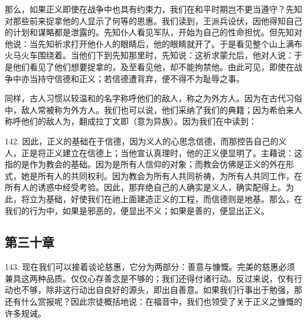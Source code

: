 那么，如果正义即使在战争中也具有约束力，我们在和平时期岂不更当遵守？先知对那些前来捉拿他的人显示了何等的恩惠。我们读到，王派兵设伏，因他得知自己的计划和谋略都是泄露的。先知仆人看见军队，开始为自己的性命担忧。但先知对他说：当先知祈求打开他仆人的眼睛后，他的眼睛就开了。于是看见整个山上满布火马火车围绕着。当他们下到先知那里时，先知说：这祈求蒙允后，他对人说：于是他们看见了他们想要捉拿的，及至看见他，却不能拘禁他。由此可见，即使在战争中亦当持守信德和正义；若信德遭背弃，便不得不为耻辱之事。\par

同样，古人习惯以较温和的名字称呼他们的敌人，称之为外方人。因为在古代习俗中，敌人常被称为外方人。我们也可以说，他们采纳了我们的典籍；因为希伯来人称呼他们的敌人为，翻成拉丁文即（意为异族）。因为我们在中读到：\par

142. 因此，正义的基础在于信德，因为义人的心思念信德，而那控告自己的义人，正是将正义建立在信德上；当他宣认真理时，他的正义便显明了。主藉说：这指的是作为教会的基础。因为是所有人信仰的对象；而教会仿佛是正义的外在形式，她是所有人的共同权利。因为教会为所有人共同祈祷，为所有人共同工作，在所有人的诱惑中经受考验。因此，那弃绝自己的人确实是义人，确实配得上。为此，将立为基础，好使我们在祂上面建造正义的工程，而信德则是地基。那么，在我们的行为中，如果是邪恶的，便显出不义；如果是善的，便显出正义。\par


\subsection{第三十章}

\par

143. 现在我们可以接着谈论慈惠，它分为两部分：善意与慷慨。完美的慈惠必须兼具这两种品质。仅仅心存善念是不够的；我们还得付诸行动。反过来说，仅有行动也不够，除非这行动出自良好的源头，即出自善意。如果我们行事出于勉强，那还有什么赏报呢？因此宗徒概括地说：在福音中，我们也领受了关于正义之慷慨的许多规诫。\par

